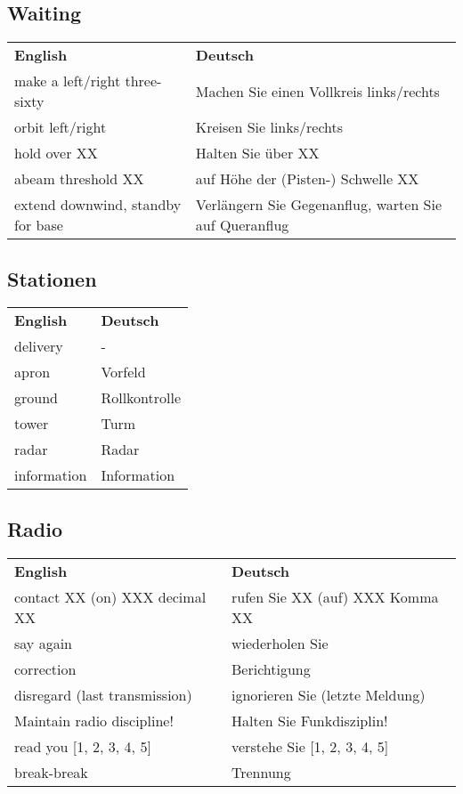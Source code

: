 \subsection{Waiting}
\begin{table}[H]
	\begin{tabularx}{\textwidth}{XX}
		\textbf{English} 					& \textbf{Deutsch}     								   	\\
		make a left/right three-sixty     	& Machen Sie einen Vollkreis links/rechts               \\
		orbit left/right   					& Kreisen Sie links/rechts           					\\
		hold over XX       					& Halten Sie über XX                 					\\
		abeam threshold XX 					& auf Höhe der (Pisten-) Schwelle XX 					\\
		extend downwind, standby for base 	& Verlängern Sie Gegenanflug, warten Sie auf Queranflug
	\end{tabularx}
\end{table}

\subsection{Stationen}
\begin{table}[H]
	\begin{tabularx}{\textwidth}{XX}
		\textbf{English} 					& \textbf{Deutsch} 				   \\
		delivery							&-   							   \\
		apron								&Vorfeld   						   \\
		ground								&Rollkontrolle   				   \\
		tower								&Turm     						   \\
		radar								&Radar						   	   \\
		information							&Information					   
	\end{tabularx}
\end{table}

\subsection{Radio}
\begin{table}[H]
	\begin{tabularx}{\textwidth}{XX}
		\textbf{English} 					& \textbf{Deutsch}                 \\
		contact XX (on) XXX decimal XX		& rufen Sie XX (auf) XXX Komma XX  \\
		say again                     		& wiederholen Sie                  \\
		correction                    		& Berichtigung                     \\
		disregard (last transmission)		& ignorieren Sie (letzte Meldung)  \\
		Maintain radio discipline!   		& Halten Sie Funkdisziplin!        \\
		read you {[}1, 2, 3, 4, 5{]} 		& verstehe Sie {[}1, 2, 3, 4, 5{]} \\
		break-break                   		& Trennung                        
	\end{tabularx}
\end{table}